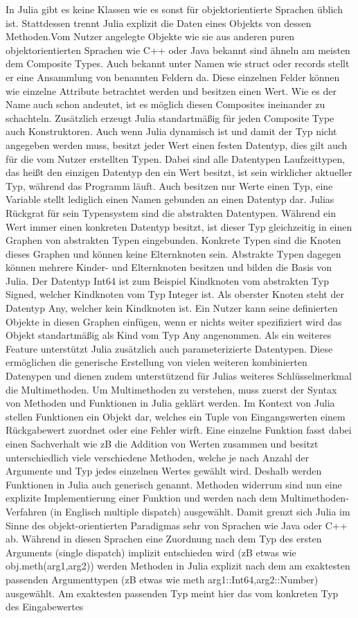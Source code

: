 \documentclass[proseminar,german,utf8]{zihpub}
\begin{document}
In Julia gibt es keine Klassen wie es sonst für objektorientierte Sprachen üblich ist. Stattdessen trennt Julia explizit die Daten eines Objekts von dessen Methoden.Vom Nutzer angelegte Objekte wie sie aus anderen puren objektorientierten Sprachen wie C++ oder Java bekannt sind ähneln am meisten dem Composite Types. Auch bekannt unter Namen wie struct oder records stellt er eine Ansammlung von benannten Feldern da. Diese einzelnen Felder können wie einzelne Attribute betrachtet werden und besitzen einen Wert. Wie es der Name auch schon andeutet, ist es möglich diesen Composites ineinander zu schachteln. Zusätzlich erzeugt Julia standartmäßig für jeden Composite Type auch Konstruktoren. Auch wenn Julia dynamisch ist und damit der Typ nicht angegeben werden muss, besitzt jeder Wert einen festen Datentyp, dies gilt auch für die vom Nutzer erstellten Typen. Dabei sind alle Datentypen Laufzeittypen, das heißt den einzigen Datentyp den ein Wert besitzt, ist sein wirklicher aktueller Typ, während das Programm läuft. Auch besitzen nur Werte einen Typ, eine Variable stellt lediglich einen Namen gebunden an einen Datentyp dar. Julias Rückgrat für sein Typensystem sind die abstrakten Datentypen. Während ein Wert immer einen konkreten Datentyp besitzt, ist dieser Typ gleichzeitig in einen Graphen von abstrakten Typen eingebunden. Konkrete Typen sind die Knoten dieses Graphen und können keine Elternknoten sein. Abstrakte Typen dagegen können mehrere Kinder- und Elternknoten besitzen und bilden die Basis von Julia. Der Datentyp Int64 ist zum Beispiel Kindknoten vom abstrakten Typ Signed, welcher Kindknoten vom Typ Integer ist. Als oberster Knoten steht der Datentyp Any, welcher kein Kindknoten ist. Ein Nutzer kann seine definierten Objekte in diesen Graphen einfügen, wenn er nichts weiter spezifiziert wird das Objekt standartmäßig als Kind vom Typ Any angenommen. Als ein weiteres Feature unterstützt Julia zusätzlich auch parameterizierte Datentypen. Diese ermöglichen die generische Erstellung von vielen weiteren kombinierten Datenypen und dienen zudem unterstützend für Julias weiteres Schlüsselmerkmal \-  die Multimethoden. Um Multimethoden zu verstehen, muss zuerst der Syntax von Methoden und Funktionen in Julia geklärt werden. Im Kontext von Julia stellen Funktionen ein Objekt dar, welches ein Tuple von Eingangswerten einem Rückgabewert zuordnet oder eine Fehler wirft. Eine einzelne Funktion fasst dabei einen Sachverhalt wie zB die Addition von Werten zusammen und besitzt unterschiedlich viele verschiedene Methoden, welche je nach Anzahl der Argumente und Typ jedes einzelnen Wertes gewählt wird. Deshalb werden Funktionen in Julia auch generisch genannt. Methoden widerrum sind nun eine explizite Implementierung einer Funktion und werden nach dem Multimethoden-Verfahren (in Englisch multiple dispatch) ausgewählt. Damit grenzt sich Julia im Sinne des objekt-orientierten Paradigmas sehr von Sprachen wie Java oder C++ ab. Während in diesen Sprachen eine Zuordnung nach dem Typ des ersten Arguments (single dispatch) implizit entschieden wird (zB etwas wie obj.meth(arg1,arg2)) werden Methoden in Julia explizit nach dem am exaktesten passenden Argumenttypen (zB etwas wie meth arg1::Int64,arg2::Number) ausgewählt. Am exaktesten passenden Typ meint hier das vom konkreten Typ des Eingabewertes 
\end{document}
